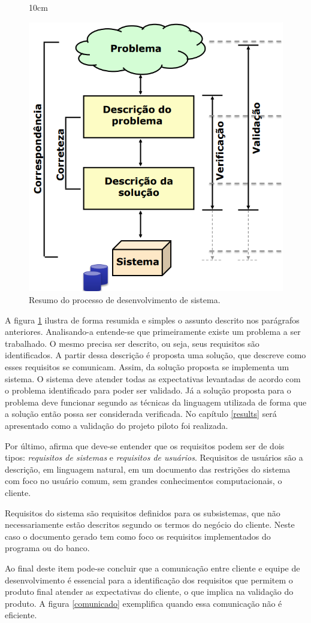 \begin{figure}[!ht]{10cm}
  \caption{Resumo do processo de desenvolvimento de sistema.} \label{verval}
  \includegraphics[width=0.5\hsize]{figuras/requisito_proj_proc.png}
\end{figure}

A figura \ref{verval} ilustra de forma resumida e simples o assunto descrito nos parágrafos anteriores. Analisando-a entende-se que primeiramente existe um problema a ser trabalhado. O mesmo precisa ser descrito, ou seja, seus requisitos são identificados. A partir dessa descrição é proposta uma solução, que descreve como esses requisitos se comunicam. Assim, da solução proposta se implementa um sistema. O sistema deve atender todas as expectativas levantadas de acordo com o problema identificado para poder ser validado. Já a solução proposta para o problema deve funcionar segundo as técnicas da linguagem utilizada de forma que a solução então possa ser considerada verificada. No capítulo \ref{results} será apresentado como a validação do projeto piloto foi realizada.

Por último,  afirma que deve-se entender que os requisitos podem ser de dois tipos: \textit{requisitos de sistemas} e \textit{requisitos de usuários}.
Requisitos de usuários são a descrição, em linguagem natural, em um documento das restrições do sistema com foco no usuário comum, sem grandes conhecimentos computacionais, o cliente.

Requisitos do sistema são requisitos definidos para os subsistemas, que não necessariamente estão descritos segundo os termos do negócio do cliente. Neste caso o documento gerado tem como foco os requisitos implementados do programa ou do banco.

Ao final deste item pode-se concluir que a comunicação entre cliente e equipe de desenvolvimento é essencial para a identificação dos requisitos que permitem o produto final atender as expectativas do cliente, o que implica na validação do produto. A figura \ref{comunicado} exemplifica quando essa comunicação não é eficiente.

